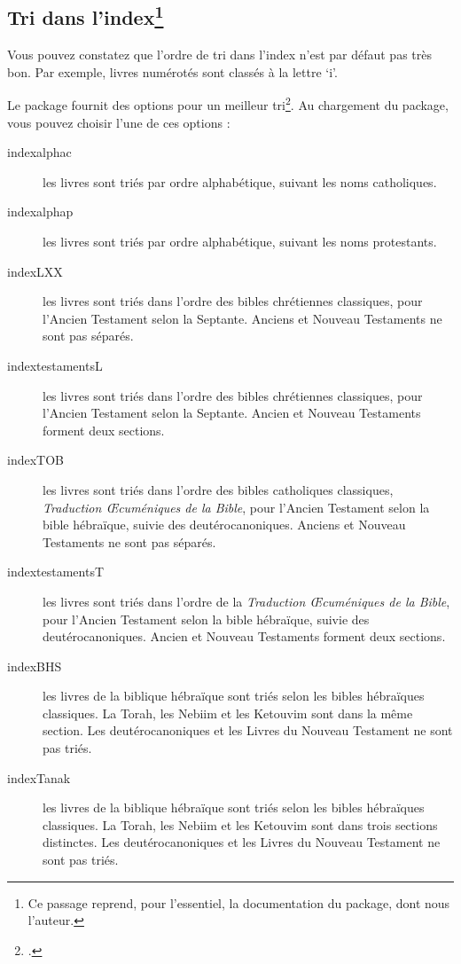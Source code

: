 \subsection[Tri dans l'index]{Tri dans l'index\footnote{Ce passage reprend, pour l'essentiel, la documentation du package, dont nous l'auteur.}}

Vous pouvez constatez que l'ordre de tri dans l'index n'est par défaut pas très bon. Par exemple, livres numérotés sont classés à la lettre `i'. 

Le package fournit des options pour un meilleur tri\footcite[Pour l'Ancien Testament les protestants suivent le canon juif pour son contenu mais utilisent l'ordre du canon catholique, voir][]{canons}. Au chargement du package, vous pouvez choisir l'une de ces options :
 \begin{description}
 \item[indexalphac] les livres sont triés par ordre alphabétique, suivant les noms catholiques.
\item[indexalphap] les livres sont triés par ordre alphabétique, suivant les noms protestants.
\item[indexLXX]les livres sont triés dans l'ordre des bibles chrétiennes classiques, pour l'Ancien Testament  selon la Septante. Anciens et Nouveau Testaments ne sont pas séparés.
\item[indextestamentsL] les livres sont triés dans l'ordre des bibles chrétiennes classiques, pour l'Ancien Testament  selon la Septante. Ancien et Nouveau Testaments forment deux sections.
\item[indexTOB] les livres sont triés dans l'ordre des bibles catholiques classiques, \emph{Traduction Œcuméniques de la Bible}, pour l'Ancien Testament  selon la bible hébraïque, suivie des deutérocanoniques. Anciens et Nouveau Testaments ne sont pas séparés.
\item[indextestamentsT] les livres sont triés dans l'ordre de la \emph{Traduction Œcuméniques de la Bible}, pour l'Ancien Testament  selon la bible hébraïque, suivie des deutérocanoniques. Ancien et Nouveau Testaments forment deux sections.
\item[indexBHS] les livres de la biblique hébraïque sont triés selon les bibles hébraïques classiques. La Torah, les Nebiim et les Ketouvim sont dans la même section. Les deutérocanoniques et les Livres du Nouveau Testament ne sont pas triés.
\item[indexTanak] les livres de la biblique hébraïque sont triés selon les bibles hébraïques classiques. La Torah, les Nebiim et les Ketouvim sont dans trois sections distinctes. Les deutérocanoniques et les Livres du Nouveau Testament ne sont pas triés.
\end{description}

